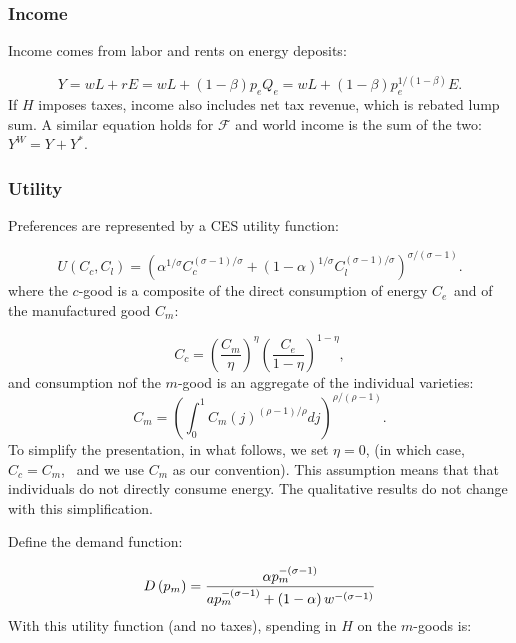 \documentclass[notitlepage,12pt]{article}
\begin{document}
\subsubsection{Income}

Income comes from labor and rents on energy deposits:

\begin{equation*}
Y=wL+rE=wL+\left( 1-\beta \right) p_{e}Q_{e}=wL+\left( 1-\beta \right)
p_{e}^{1/\left( 1-\beta \right) }E.
\end{equation*}%
If $H$ imposes taxes, income also includes net tax revenue, which is rebated
lump sum. A similar equation holds for $\mathcal{F}$ and world income is the
sum of the two: $Y^{W}=Y+Y^{\ast }$.

\subsubsection{Utility}

Preferences are represented by a CES utility function:

\begin{equation}
U\left( C_{c},C_{l}\right) =\left( \alpha ^{1/\sigma }C_{c}^{\left( \sigma
-1\right) /\sigma }+\left( 1-\alpha \right) ^{1/\sigma }C_{l}^{\left( \sigma
-1\right) /\sigma }\right) ^{\sigma /\left( \sigma -1\right) }.
\label{utility}
\end{equation}%
where the $c$-good is a composite of the direct consumption of energy $C_{e%
\text{ }}$and of the manufactured good $C_{m}$:

\begin{equation*}
C_{c}=\left( \frac{C_{m}}{\eta }\right) ^{\eta }\left( \frac{C_{e}}{1-\eta }%
\right) ^{1-\eta },
\end{equation*}%
and consumption nof the $m$-good is an aggregate of the individual varieties:%
\begin{equation*}
C_{m}=\left( \int_{0}^{1}C_{m}(j)^{\left( \rho -1\right) /\rho }dj\right)
^{\rho /\left( \rho -1\right) }.
\end{equation*}%
To simplify the presentation, in what follows, we set $\eta =0$, (in which
case, $C_{c}=C_{m}$, \ and we use $C_{m}$ as our convention). This
assumption means that that individuals do not directly consume energy. The
qualitative results do not change with this simplification.

Define the demand function:

\begin{equation*}
D\left( p_{m}\right) =\frac{\alpha p_{m}^{-\left( \sigma -1\right) }}{%
ap_{m}^{-\left( \sigma -1\right) }+\left( 1-\alpha \right) w^{-\left( \sigma
-1\right) }}
\end{equation*}%
With this utility function (and no taxes), spending in $H$ on the $m$-goods
is:
\end{document}
